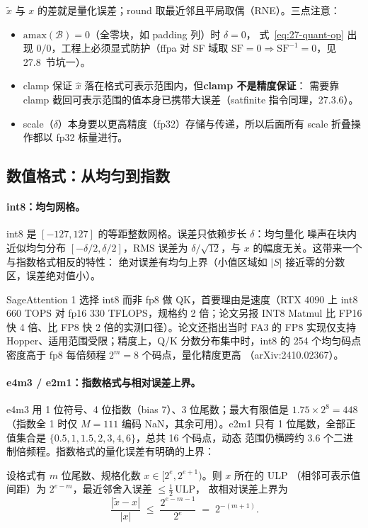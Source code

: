 $\tilde{x}$ 与 $x$ 的差就是量化误差；round 取最近邻且平局取偶（RNE）。三点注意：
\begin{itemize}[itemsep=2pt,topsep=2pt]
  \item $\mathrm{amax}(\mathcal{B}) = 0$（全零块，如 padding 列）时 $\delta = 0$，
        式~\ref{eq:27-quant-op} 出现 $0/0$，工程上必须显式防护（ffpa 对 SF 域取
        $\mathrm{SF} = 0 \Rightarrow \mathrm{SF}^{-1} = 0$，见 27.8~节坑一）。
  \item clamp 保证 $\hat{x}$ 落在格式可表示范围内，但\textbf{clamp 不是精度保证}：
        需要靠 clamp 截回可表示范围的值本身已携带大误差（satfinite 指令同理，27.3.6）。
  \item scale（$\delta$）本身要以更高精度（fp32）存储与传递，所以后面所有
        scale 折叠操作都以 fp32 标量进行。
\end{itemize}

\subsection{数值格式：从均匀到指数}

\paragraph{int8：均匀网格。}
int8 是 $[-127,127]$ 的等距整数网格。误差只依赖步长 $\delta$：均匀量化
噪声在块内近似均匀分布 $[-\delta/2, \delta/2]$，RMS 误差为
$\delta/\sqrt{12}$，与 $x$ 的幅度无关。这带来一个与指数格式相反的特性：
绝对误差有均匀上界（小值区域如 $|S|$ 接近零的分数区，误差绝对值小）。

SageAttention 1 选择 int8 而非 fp8 做 QK，首要理由是速度（RTX 4090 上
int8 660 TOPS 对 fp16 330 TFLOPS，规格约 2 倍；论文另报 INT8 Matmul 比 FP16
快 4 倍、比 FP8 快 2 倍的实测口径）。论文还指出当时 FA3 的 FP8 实现仅支持
Hopper、适用范围受限；精度上，Q/K 分数分布集中时，int8
的 254 个均匀码点密度高于 fp8 每倍频程 $2^m=8$ 个码点，量化精度更高
（arXiv:2410.02367）。

\paragraph{e4m3 / e2m1：指数格式与相对误差上界。}
e4m3 用 1 位符号、4 位指数（bias 7）、3 位尾数；最大有限值是
$1.75 \times 2^{8} = 448$（指数全 1 时仅 $M=111$ 编码 NaN，其余可用）。e2m1 只有
1 位尾数，全部正值集合是 $\{0.5, 1, 1.5, 2, 3, 4, 6\}$，总共 16 个码点，动态
范围仍横跨约 3.6 个二进制倍频程。指数格式的量化误差有明确的上界：

\begin{theorem}[指数格式的相对误差上界]\label{thm:27-relstep}
设格式有 $m$ 位尾数、规格化数 $x \in [2^{e}, 2^{e+1})$。则 $x$ 所在的 ULP
（相邻可表示值间距）为 $2^{e-m}$，最近邻舍入误差 $\le \tfrac{1}{2}\,\mathrm{ULP}$，
故相对误差上界为
\begin{equation}
  \frac{|\tilde{x} - x|}{|x|}
  \;\le\;
  \frac{2^{e-m-1}}{2^{e}}
  \;=\; 2^{-(m+1)} .
  \label{eq:27-relstep}
\end{equation}
\end{theorem}

